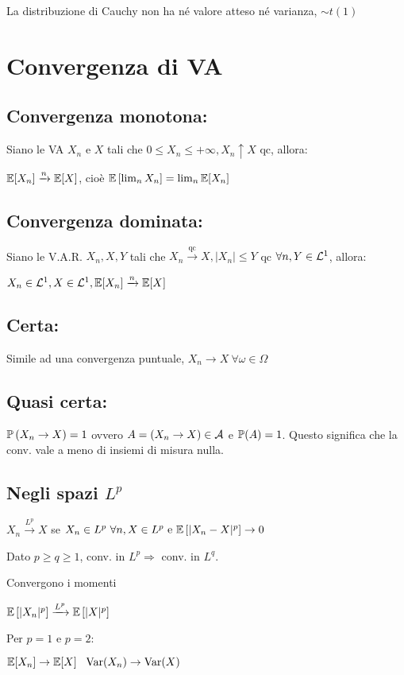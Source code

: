 La distribuzione di Cauchy non ha né valore atteso né varianza, $\sim t( 1)$
\section{Convergenza di VA}
\subsection{Convergenza monotona:}

Siano le VA $X_n$ e $X$ tali che $0\leq X_n \leq +\infty ,X_n \uparrow X$ qc, allora:

$\mathbb E[ X_n]\xrightarrow{n}\mathbb E[X]$, cioè $\mathbb E\left[\lim_n X_n\right] =\lim_n\mathbb E[ X_n]$
\subsection{Convergenza dominata:}

Siano le V.A.R. $X_n ,X,Y$ tali che $X_n\xrightarrow{\text{qc}} X,| X_n| \leq Y$ qc $\forall n,Y\in \mathcal L^1$, allora:

$X_n \in \mathcal L^1 ,X\in \mathcal L^1 ,\mathbb E[ X_n]\xrightarrow{n} \mathbb E[X]$
\subsection{Certa:}

Simile ad una convergenza puntuale, $X_n\rightarrow X\ \forall \omega \in \Omega $
\subsection{Quasi certa:}

$\mathbb P\left( X_n\rightarrow X\right) =1$ ovvero $A=\left( X_n\rightarrow X\right) \in \mathcal A$ e $\mathbb P (A)=1$. Questo significa che la conv. vale a meno di insiemi di misura nulla.
\subsection{Negli spazi $L^p$}

$X_n\xrightarrow{L^p} X$ se $X_n \in L^p \ \forall n,X\in L^p \ \text{e} \ \EE\left[| X_n -X|^p\right]\rightarrow 0$

Dato $p\geq q\geq 1$, conv. in $L^p \Rightarrow $ conv. in $L^q$.

Convergono i momenti

$\mathbb E\left[| X_n|^p\right]\xrightarrow{L^p}\mathbb E\left[ |X|^p\right]$

Per $p=1$ e $p=2$:

$\EE[ X_n]\rightarrow \EE[X]\ \ \Var(X_n)\rightarrow \Var(X)$
